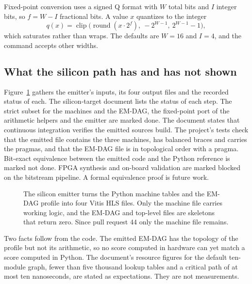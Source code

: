 Fixed-point conversion uses a signed Q format with $W$ total bits and $I$ integer bits, so
$f = W - I$ fractional bits. A value $x$ quantizes to the integer
\begin{equation}
q(x) = \operatorname{clip}\bigl(\operatorname{round}(x \cdot 2^{f}),\ -2^{W-1},\ 2^{W-1}-1\bigr),
\label{eq:compiler-quant}
\end{equation}
which saturates rather than wraps. The defaults are $W = 16$ and $I = 4$, and the command accepts
other widths.

\subsection{What the silicon path has and has not shown}

Figure~\ref{fig:compiler-silicon} gathers the emitter's inputs, its four output files and the
recorded status of each. The silicon-target document lists the status of each step. The strict subset for the machines and
the EM-DAG, the fixed-point port of the arithmetic helpers and the emitter are marked done. The
document states that continuous integration verifies the emitted sources build. The project's
tests check that the emitted file contains the three machines, has balanced braces and carries the
pragmas, and that the EM-DAG file is in topological order with a  pragma.
Bit-exact equivalence between the emitted code and the Python reference is marked not done. FPGA
synthesis and on-board validation are marked blocked on the bitstream pipeline. A formal
equivalence proof is future work.

\begin{figure}[t]
\centering

\caption{The silicon emitter turns the Python machine tables and the EM-DAG profile into four
Vitis HLS files. Only the machine file carries working logic, and the EM-DAG and top-level files
are skeletons that return zero. Since pull request 44 only the machine file remains.}
\label{fig:compiler-silicon}
\end{figure}

Two facts follow from the code. The emitted EM-DAG has the topology of the profile but not its
arithmetic, so no score computed in hardware can yet match a score computed in Python. The
document's resource figures for the default ten-module graph, fewer than five thousand lookup
tables and a critical path of at most ten nanoseconds, are stated as expectations. They are not
measurements.

